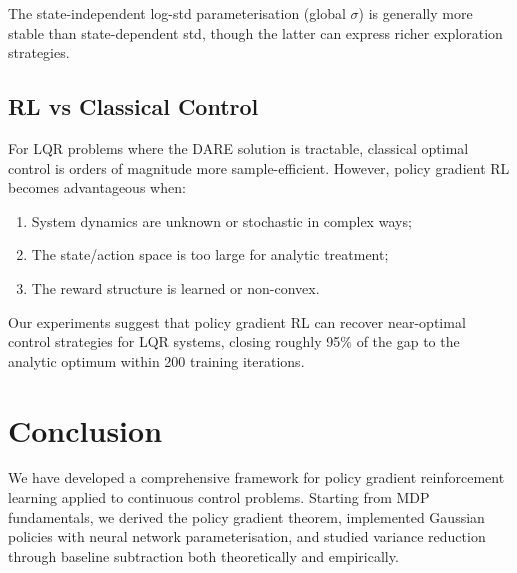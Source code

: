 \documentclass[11pt, a4paper]{article}
\begin{document}
The state-independent log-std parameterisation (global $\sigma$) is generally
more stable than state-dependent std, though the latter can express richer
exploration strategies.

\subsection{RL vs Classical Control}

For LQR problems where the DARE solution is tractable, classical optimal control
is orders of magnitude more sample-efficient.
However, policy gradient RL becomes advantageous when:
\begin{enumerate}
    \item System dynamics are unknown or stochastic in complex ways;
    \item The state/action space is too large for analytic treatment;
    \item The reward structure is learned or non-convex.
\end{enumerate}

Our experiments suggest that policy gradient RL can recover near-optimal control
strategies for LQR systems, closing roughly 95\% of the gap to the analytic optimum
within 200 training iterations.

\section{Conclusion}
\label{sec:conclusion}

We have developed a comprehensive framework for policy gradient reinforcement
learning applied to continuous control problems.
Starting from MDP fundamentals, we derived the policy gradient theorem, implemented
Gaussian policies with neural network parameterisation, and studied variance
reduction through baseline subtraction both theoretically and empirically.
\end{document}
